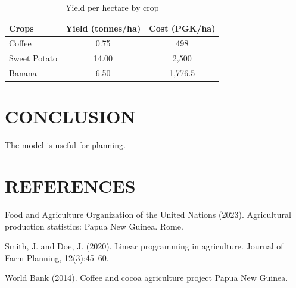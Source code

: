 \documentclass[a4paper,10pt]{article}
\begin{document}
\begin{table}[h]
\centering
\caption{Yield per hectare by crop}
\begin{tabular}{lcc}
\hline
Crops & Yield (tonnes/ha) & Cost (PGK/ha) \\
\hline
Coffee & 0.75 & 498 \\
Sweet Potato & 14.00 & 2,500 \\
Banana & 6.50 & 1,776.5 \\
\hline
\end{tabular}
\end{table}

\section{CONCLUSION}
The model is useful for planning.

\section*{REFERENCES}
\noindent Food and Agriculture Organization of the United Nations (2023). Agricultural production statistics: Papua New Guinea. Rome.

\noindent Smith, J. and Doe, J. (2020). Linear programming in agriculture. Journal of Farm Planning, 12(3):45--60.

\noindent World Bank (2014). Coffee and cocoa agriculture project Papua New Guinea.
\end{document}
